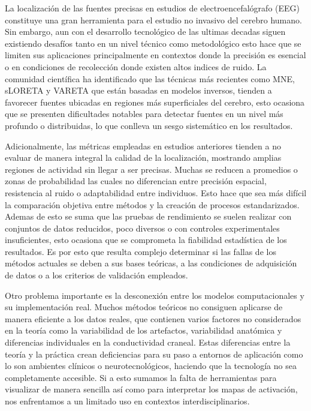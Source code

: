 

La localización de las fuentes precisas en estudios de electroencefalógrafo (EEG) constituye una gran herramienta para el estudio no invasivo del cerebro humano. Sin embargo, aun con el desarrollo tecnológico de las ultimas decadas siguen existiendo desafíos tanto en un nivel técnico como metodológico esto hace que se limiten sus aplicaciones principalmente en contextos donde la precisión es esencial o en condiciones de recolección donde existen altos indices de ruido. La comunidad científica ha identificado que las técnicas más recientes como MNE, sLORETA y VARETA que están basadas en modelos inversos, tienden a favorecer fuentes ubicadas en regiones más superficiales del cerebro, esto ocasiona que se presenten dificultades notables para detectar fuentes en un nivel más profundo o distribuidas, lo que conlleva un sesgo sistemático en los resultados.

Adicionalmente, las métricas empleadas en estudios anteriores tienden a no evaluar de manera integral la calidad de la localización, mostrando amplias regiones de actividad sin llegar a ser precisas. Muchas se reducen a promedios o zonas de probabilidad las cuales no diferencian entre precisión espacial, resistencia al ruido o adaptabilidad entre individuos. Esto hace que sea más difícil la comparación objetiva entre métodos y la creación de procesos estandarizados. Ademas de esto se suma que las pruebas de rendimiento  se suelen realizar con conjuntos de datos reducidos, poco diversos o con controles experimentales insuficientes, esto ocasiona que se comprometa la fiabilidad estadística de los resultados. Es por esto que resulta complejo determinar si las fallas de los métodos actuales se deben a sus bases teóricas, a las condiciones de adquisición de datos o a los criterios de validación empleados.

Otro problema importante es la desconexión entre los modelos computacionales y su implementación real. Muchos métodos teóricos no consiguen aplicarse de manera eficiente a los datos reales, que contienen varios factores no considerados en la teoría como la variabilidad de los artefactos, variabilidad anatómica y diferencias individuales en la conductividad craneal. Estas diferencias entre la teoría y la práctica crean deficiencias para su paso a entornos de aplicación como lo son ambientes clínicos o neurotecnológicos, haciendo que la tecnología no sea completamente accesible. Si a esto sumamos la falta de herramientas para visualizar de manera sencilla así como para interpretar los mapas de activación, nos enfrentamos a un limitado uso en contextos interdisciplinarios.

